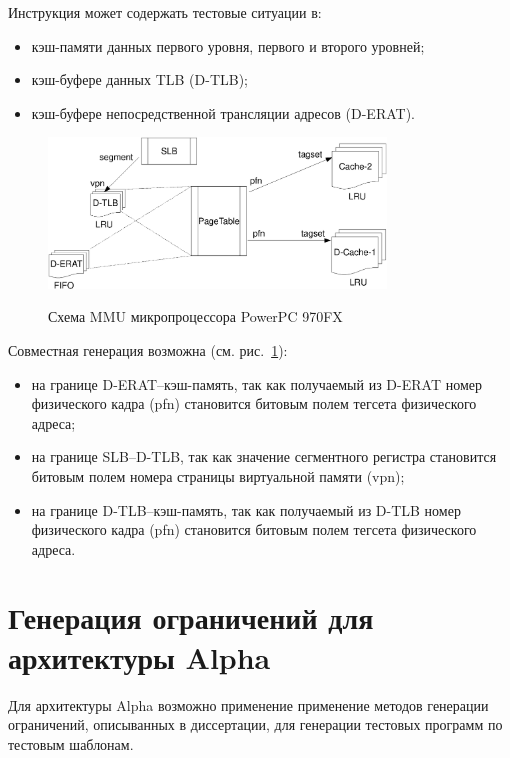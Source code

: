 Инструкция может содержать тестовые ситуации в:
\begin{itemize}
  \item кэш-памяти данных первого уровня, первого и второго уровней;
  \item кэш-буфере данных TLB (D-TLB);
  \item кэш-буфере непосредственной трансляции адресов (D-ERAT).
\end{itemize}

\begin{figure}[h] \center
  \includegraphics[width=0.8\textwidth]{4.analysis/ppc}\\
  \caption{Схема MMU микропроцессора PowerPC 970FX}\label{powerpc_mmu_scheme}
\end{figure}

Совместная генерация возможна (см. рис.~\ref{powerpc_mmu_scheme}):
\begin{itemize}
  \item на границе D-ERAT--кэш-память, так как получаемый из D-ERAT номер
физического кадра (pfn) становится битовым полем тегсета физического
адреса;
  \item на границе SLB--D-TLB, так как значение сегментного регистра
  становится битовым полем номера страницы виртуальной памяти (vpn);
  \item на границе D-TLB--кэш-память, так как получаемый из D-TLB номер
физического кадра (pfn) становится битовым полем тегсета физического
адреса.
\end{itemize}

\section{Генерация ограничений для архитектуры Alpha}

\begin{utv}
Для архитектуры Alpha возможно применение применение методов
генерации ограничений, описыванных в диссертации, для генерации
тестовых программ по тестовым шаблонам.
\end{utv}

